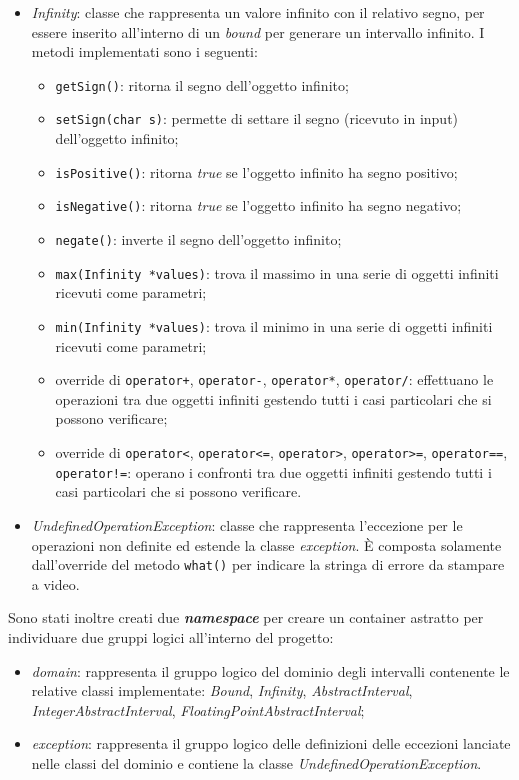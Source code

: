 \documentclass[a4paper, 10pt]{report}
\begin{document}
\begin{itemize}
\begin{itemize}
	\end{itemize}
	\item \textit{Infinity}: classe che rappresenta un valore infinito con il relativo segno, per essere inserito all'interno di un \textit{bound} per generare un intervallo infinito. I metodi implementati sono i seguenti:
	\begin{itemize}
		\item \verb|getSign()|: ritorna il segno dell'oggetto infinito;
		\item \verb|setSign(char s)|: permette di settare il segno (ricevuto in input) dell'oggetto infinito;
		\item \verb|isPositive()|: ritorna \textit{true} se l'oggetto infinito ha segno positivo;
		\item \verb|isNegative()|: ritorna \textit{true} se l'oggetto infinito ha segno negativo;
		\item \verb|negate()|: inverte il segno dell'oggetto infinito;
		\item \verb|max(Infinity *values)|: trova il massimo in una serie di oggetti infiniti ricevuti come parametri;
		\item \verb|min(Infinity *values)|: trova il minimo in una serie di oggetti infiniti ricevuti come parametri;
		\item override di \verb|operator+|, \verb|operator-|, \verb|operator*|, \verb|operator/|: effettuano le operazioni tra due oggetti infiniti gestendo tutti i casi particolari che si possono verificare;
		\item override di \verb|operator<|, \verb|operator<=|, \verb|operator>|, \verb|operator>=|, \verb|operator==|, \verb|operator!=|: operano i confronti tra due oggetti infiniti gestendo tutti i casi particolari che si possono verificare.
	\end{itemize}
	\item \textit{UndefinedOperationException}: classe che rappresenta l'eccezione per le operazioni non definite ed estende la classe \textit{exception}. È composta solamente dall'override del metodo \verb|what()| per indicare la stringa di errore da stampare a video.
	\newline
\end{itemize}

\noindent
Sono stati inoltre creati due \textbf{\textit{namespace}} per creare un container astratto per individuare due gruppi logici all'interno del progetto:
\begin{itemize}
	\item \textit{domain}: rappresenta il gruppo logico del dominio degli intervalli contenente le relative classi implementate: \textit{Bound}, \textit{Infinity}, \textit{AbstractInterval}, \textit{IntegerAbstractInterval}, \textit{FloatingPointAbstractInterval};
	\item \textit{exception}: rappresenta il gruppo logico delle definizioni delle eccezioni lanciate nelle classi del dominio e contiene la classe \textit{UndefinedOperationException}.
\end{itemize}
\end{document}
